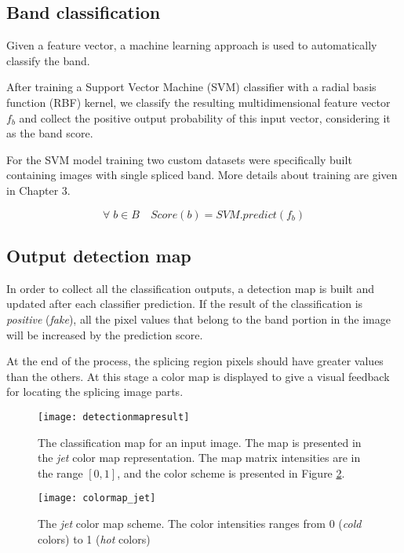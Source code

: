 \subsection{Band classification}

Given a feature vector, a machine learning approach is used to automatically classify the band. 

After training a Support Vector Machine (SVM)\cite{bishop2007pattern} classifier with a radial basis function (RBF) kernel, we classify the resulting multidimensional feature vector $f_b$ and collect the positive output probability of this input vector, considering it as the band score.

For the SVM model training two custom datasets were specifically built containing images with single spliced band. More details about training are given in Chapter 3. 

$$
\forall \; b \in B \quad Score(b) = SVM.predict(f_b)
$$

\subsection{Output detection map}

In order to collect all the classification outputs, a detection map is built and updated after each classifier prediction. If the result of the classification is \emph{positive} (\emph{fake}), all the pixel values that belong to the band portion in the image will be increased by the prediction score.

At the end of the process, the splicing region pixels should have greater values than the others. At this stage a color map is displayed to give a visual feedback for locating the splicing image parts.

\begin{figure}[h!]
\vspace{1cm}
  \centering
    \texttt{[image: detectionmapresult]}
    \caption{The classification map for an input image. The map is presented in the \emph{jet} color map representation. The map matrix intensities are in the range $[0, 1]$, and the color scheme is presented in Figure \ref{fig:colormapjet}.}\label{fig:regionsdetectionmap}
\end{figure}

\begin{figure}[h!]
\vspace{1cm}
  \centering
    \texttt{[image: colormap\_jet]}
    \caption{The \emph{jet} color map scheme. The color intensities ranges from 0 (\emph{cold} colors) to 1 (\emph{hot} colors)}
    \label{fig:colormapjet}
\end{figure}

